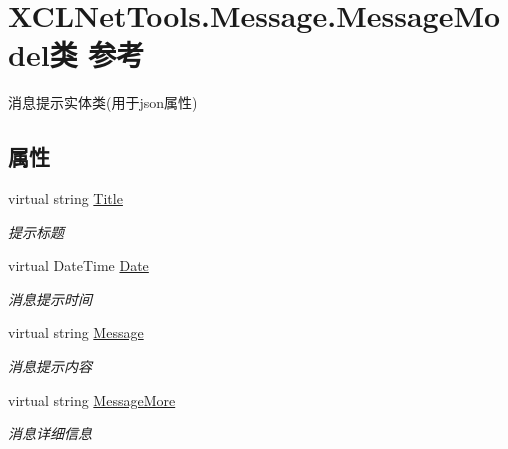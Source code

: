 \hypertarget{class_x_c_l_net_tools_1_1_message_1_1_message_model}{}\section{X\+C\+L\+Net\+Tools.\+Message.\+Message\+Model类 参考}
\label{class_x_c_l_net_tools_1_1_message_1_1_message_model}


消息提示实体类(用于json属性)  


\subsection*{属性}
\begin{DoxyCompactItemize}
\item 
virtual string \hyperlink{class_x_c_l_net_tools_1_1_message_1_1_message_model_a2347b5cf1ac7736de79aa94abd252d85}{Title}
\begin{DoxyCompactList}\small\item\em 提示标题 \end{DoxyCompactList}\item 
virtual Date\+Time \hyperlink{class_x_c_l_net_tools_1_1_message_1_1_message_model_a04ede00490c3dbabea1fc01e6150715a}{Date}
\begin{DoxyCompactList}\small\item\em 消息提示时间 \end{DoxyCompactList}\item 
virtual string \hyperlink{class_x_c_l_net_tools_1_1_message_1_1_message_model_a1fb1dde64c832e59d688d9a9fe944da5}{Message}
\begin{DoxyCompactList}\small\item\em 消息提示内容 \end{DoxyCompactList}\item 
virtual string \hyperlink{class_x_c_l_net_tools_1_1_message_1_1_message_model_ae30c575345756a20443bb2f26ecdf1e9}{Message\+More}
\begin{DoxyCompactList}\small\item\em 消息详细信息 \end{DoxyCompactList}\item 

\end{DoxyCompactItemize}
